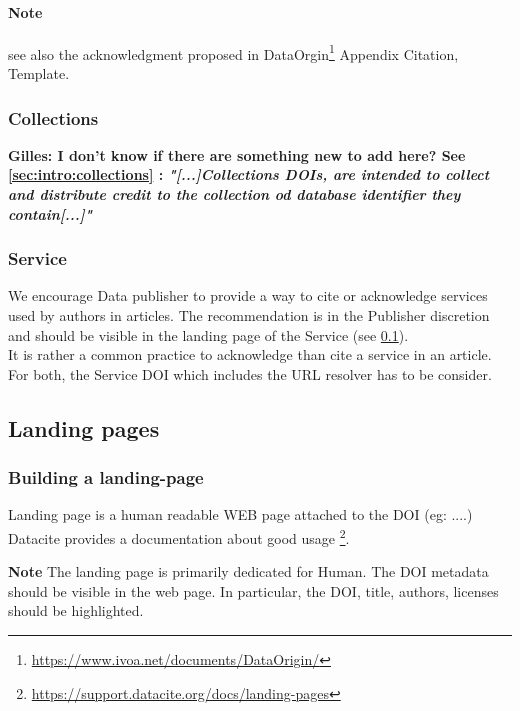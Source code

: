 \documentclass[11pt,a4paper]{ivoa}
\newcommand{\important}[1]{
	\begin{bigdescription}
		\item \color{ivoacolor}\textbf{Note} #1
	\end{bigdescription}
}
\begin{document}
\paragraph{Note} see also the acknowledgment proposed in DataOrgin\footnote{\url{https://www.ivoa.net/documents/DataOrigin/}} Appendix Citation, Template.

\subsubsection{Collections}
\textbf{\color{red} Gilles: I don't know if there are something new to add here?
See \ref{sec:intro:collections} : 
\textit{"[...]Collections DOIs, are intended to collect and distribute credit to the collection od database identifier they contain[...]"}
}

\subsubsection{Service}
We encourage Data publisher to provide a way to cite or acknowledge services used by authors in articles. The recommendation is in the Publisher discretion and should be visible in the landing page of the Service (see \ref{sec:landingpage}).\\

It is rather a common practice to acknowledge than cite a service in an article. For both, the Service DOI which includes the URL resolver has to be consider.

\subsection{Landing pages}
\label{sec:landingpage}

\subsubsection{Building a landing-page}
Landing page is a human readable WEB page attached to the DOI (eg: ....) Datacite provides a documentation about good usage \footnote{\url{https://support.datacite.org/docs/landing-pages}}.

\important{
	The landing page is primarily dedicated for Human. 
	The DOI metadata should be visible in the web page. In particular, 
	the DOI, title, authors, licenses should be highlighted.
}
\end{document}
